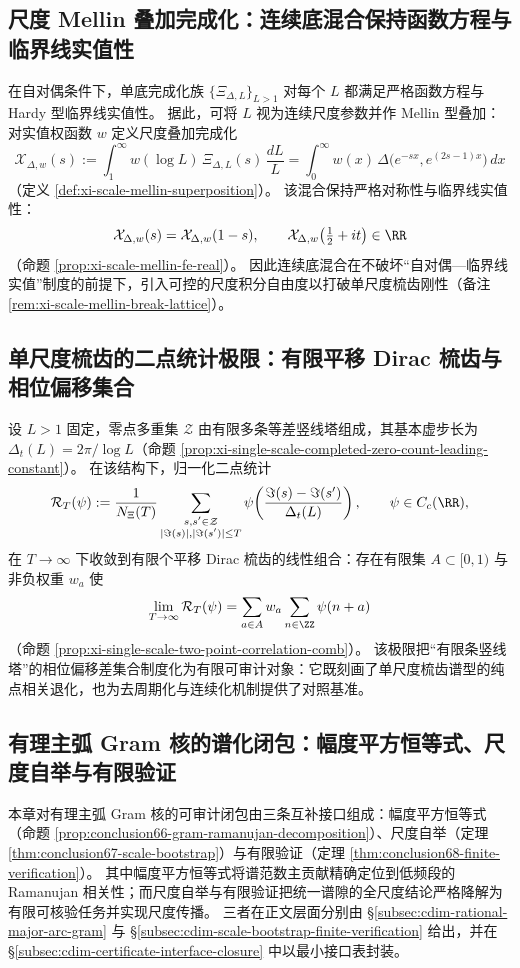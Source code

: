 \subsection{尺度 Mellin 叠加完成化：连续底混合保持函数方程与临界线实值性}\label{subsec:cdim-scale-mellin-superposition}
在自对偶条件下，单底完成化族 \(\{\Xi_{\Delta,L}\}_{L>1}\) 对每个 \(L\) 都满足严格函数方程与 Hardy 型临界线实值性。
据此，可将 \(L\) 视为连续尺度参数并作 Mellin 型叠加：对实值权函数 \(w\) 定义尺度叠加完成化
\[
\mathcal X_{\Delta,w}(s)
:=\int_{1}^{\infty} w(\log L)\,\Xi_{\Delta,L}(s)\,\frac{dL}{L}
=\int_{0}^{\infty} w(x)\,\Delta\!\bigl(e^{-sx},e^{(2s-1)x}\bigr)\,dx
\]
（定义 \ref{def:xi-scale-mellin-superposition}）。
该混合保持严格对称性与临界线实值性：
\[
\mathcal X_{\Delta,w}(s)=\mathcal X_{\Delta,w}(1-s),
\qquad
\mathcal X_{\Delta,w}\!\left(\tfrac12+it\right)\in\RR
\]
（命题 \ref{prop:xi-scale-mellin-fe-real}）。
因此连续底混合在不破坏“自对偶—临界线实值”制度的前提下，引入可控的尺度积分自由度以打破单尺度梳齿刚性（备注 \ref{rem:xi-scale-mellin-break-lattice}）。

\subsection{单尺度梳齿的二点统计极限：有限平移 Dirac 梳齿与相位偏移集合}\label{subsec:cdim-single-scale-comb-two-point}
设 \(L>1\) 固定，零点多重集 \(\mathcal Z\) 由有限多条等差竖线塔组成，其基本虚步长为 \(\Delta_t(L)=2\pi/\log L\)（命题 \ref{prop:xi-single-scale-completed-zero-count-leading-constant}）。
在该结构下，归一化二点统计
\[
\mathcal R_T(\psi)
:=\frac{1}{N_{\Xi}(T)}
\sum_{\substack{s,s'\in\mathcal Z\\ |\Im(s)|,|\Im(s')|\le T}}
\psi\!\left(\frac{\Im(s)-\Im(s')}{\Delta_t(L)}\right),
\qquad \psi\in C_c(\RR),
\]
在 \(T\to\infty\) 下收敛到有限个平移 Dirac 梳齿的线性组合：存在有限集 \(A\subset[0,1)\) 与非负权重 \(w_a\) 使
\[
\lim_{T\to\infty}\mathcal R_T(\psi)=\sum_{a\in A} w_a \sum_{n\in\ZZ}\psi(n+a)
\]
（命题 \ref{prop:xi-single-scale-two-point-correlation-comb}）。
该极限把“有限条竖线塔”的相位偏移差集合制度化为有限可审计对象：它既刻画了单尺度梳齿谱型的纯点相关退化，也为去周期化与连续化机制提供了对照基准。

\subsection{有理主弧 Gram 核的谱化闭包：幅度平方恒等式、尺度自举与有限验证}\label{subsec:cdim-gram-spectral-closure}
本章对有理主弧 Gram 核的可审计闭包由三条互补接口组成：幅度平方恒等式（命题 \ref{prop:conclusion66-gram-ramanujan-decomposition}）、尺度自举（定理 \ref{thm:conclusion67-scale-bootstrap}）与有限验证（定理 \ref{thm:conclusion68-finite-verification}）。
其中幅度平方恒等式将谱范数主贡献精确定位到低频段的 Ramanujan 相关性；而尺度自举与有限验证把统一谱隙的全尺度结论严格降解为有限可核验任务并实现尺度传播。
三者在正文层面分别由 \S\ref{subsec:cdim-rational-major-arc-gram} 与 \S\ref{subsec:cdim-scale-bootstrap-finite-verification} 给出，并在 \S\ref{subsec:cdim-certificate-interface-closure} 中以最小接口表封装。


